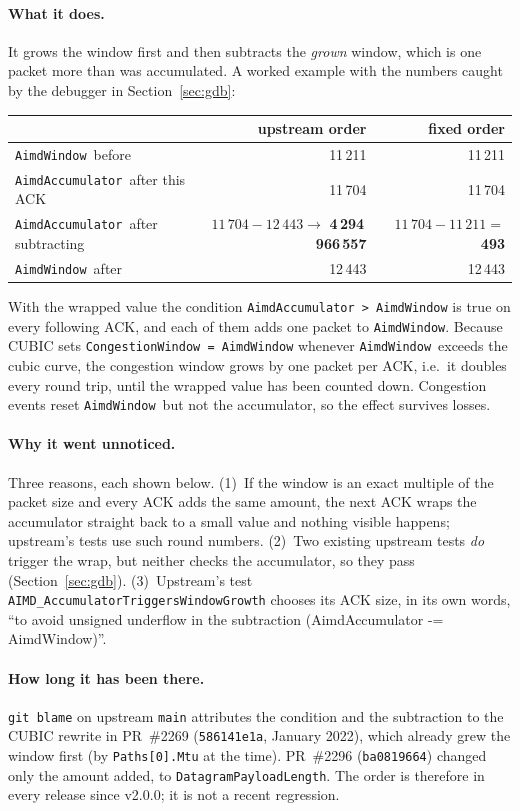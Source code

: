 \documentclass[11pt,a4paper]{article}
\newcommand{\acc}{\texttt{AimdAccumulator}}
\newcommand{\aw}{\texttt{AimdWindow}}
\begin{document}
\paragraph{What it does.} It grows the window first and then subtracts the
\emph{grown} window, which is one packet more than was accumulated. A worked
example with the numbers caught by the debugger in Section~\ref{sec:gdb}:
\begin{center}\small
\begin{tabular}{@{}lrr@{}}
\toprule
 & upstream order & fixed order \\
\midrule
\aw\ before & 11\,211 & 11\,211 \\
\acc\ after this ACK & 11\,704 & 11\,704 \\
\acc\ after subtracting & $11\,704 - 12\,443 \to$ \textcolor{bad}{\textbf{4\,294\,966\,557}} & $11\,704 - 11\,211 =$ \textcolor{good}{\textbf{493}} \\
\aw\ after & 12\,443 & 12\,443 \\
\bottomrule
\end{tabular}
\end{center}
With the wrapped value the condition \texttt{AimdAccumulator > AimdWindow} is
true on every following ACK, and each of them adds one packet to \aw. Because
CUBIC sets \texttt{CongestionWindow = AimdWindow} whenever \aw\ exceeds the
cubic curve, the congestion window grows by one packet per ACK, i.e.\ it
doubles every round trip, until the wrapped value has been counted down.
Congestion events reset \aw\ but not the accumulator, so the effect survives
losses.

\paragraph{Why it went unnoticed.} Three reasons, each shown below.
(1)~If the window is an exact multiple of the packet size and every ACK adds
the same amount, the next ACK wraps the accumulator straight back to a small
value and nothing visible happens; upstream's tests use such round numbers.
(2)~Two existing upstream tests \emph{do} trigger the wrap, but neither checks
the accumulator, so they pass (Section~\ref{sec:gdb}). (3)~Upstream's test
\texttt{AIMD\_\allowbreak{}Accumulator\allowbreak{}Triggers\allowbreak{}Window\allowbreak{}Growth} chooses its ACK size, in its
own words, ``to avoid unsigned underflow in the subtraction
(AimdAccumulator -= AimdWindow)''.

\paragraph{How long it has been there.} \texttt{git blame} on upstream
\texttt{main} attributes the condition and the subtraction to the CUBIC rewrite
in PR~\#2269 (\texttt{586141e1a}, January 2022), which already grew the window
first (by \texttt{Paths[0].Mtu} at the time). PR~\#2296 (\texttt{ba0819664})
changed only the amount added, to \texttt{DatagramPayloadLength}. The order is
therefore in every release since v2.0.0; it is not a recent regression.
\end{document}
